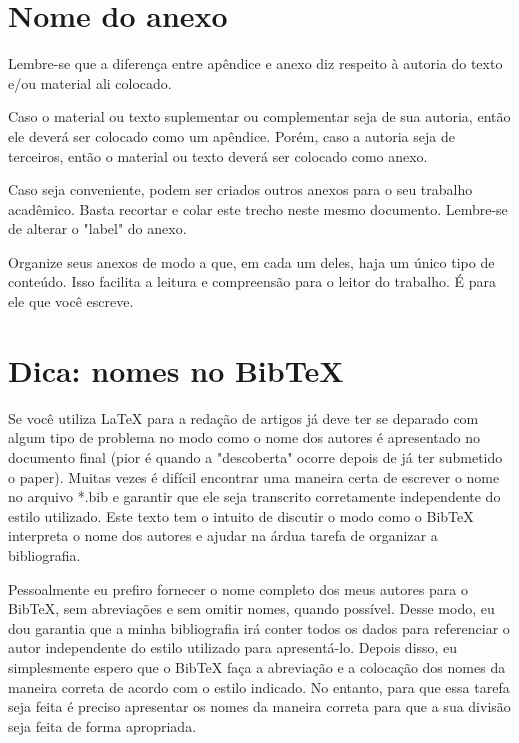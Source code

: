 
%

\begin{anexosenv}
\partanexos

\chapter{Nome do anexo}     %
\label{chap:anexoA}

Lembre-se que a diferença entre apêndice e anexo diz respeito à autoria do texto
e/ou material ali colocado.

Caso o material ou texto suplementar ou complementar seja de sua autoria, então
ele deverá ser colocado como um apêndice. Porém, caso a autoria seja de
terceiros, então o material ou texto deverá ser colocado como anexo.

Caso seja conveniente, podem ser criados outros anexos para o seu trabalho
acadêmico. Basta recortar e colar este trecho neste mesmo documento. Lembre-se
de alterar o "label"{} do anexo.

Organize seus anexos de modo a que, em cada um deles, haja um único tipo de
conteúdo. Isso facilita a leitura e compreensão para o leitor do trabalho. É
para ele que você escreve.

\chapter{Dica: nomes no BibTeX}
\label{chap:anexoB}

Se você utiliza LaTeX para a redação de artigos já deve ter se deparado com
algum tipo de problema no modo como o nome dos autores é apresentado no
documento final (pior é quando a "descoberta"{} ocorre depois de já ter
submetido o paper). Muitas vezes é difícil encontrar uma maneira certa de
escrever o nome no arquivo *.bib e garantir que ele seja transcrito corretamente
independente do estilo utilizado. Este texto tem o intuito de discutir o modo
como o BibTeX interpreta o nome dos autores e ajudar na árdua tarefa de
organizar a bibliografia.

Pessoalmente eu prefiro fornecer o nome completo dos meus autores para o BibTeX,
sem abreviações e sem omitir nomes, quando possível. Desse modo, eu dou garantia
que a minha bibliografia irá conter todos os dados para referenciar o autor
independente do estilo utilizado para apresentá-lo. Depois disso, eu
simplesmente espero que o BibTeX faça a abreviação e a colocação dos nomes da
maneira correta de acordo com o estilo indicado. No entanto, para que essa
tarefa seja feita é preciso apresentar os nomes da maneira correta para que a
sua divisão seja feita de forma apropriada.


\end{anexosenv}
